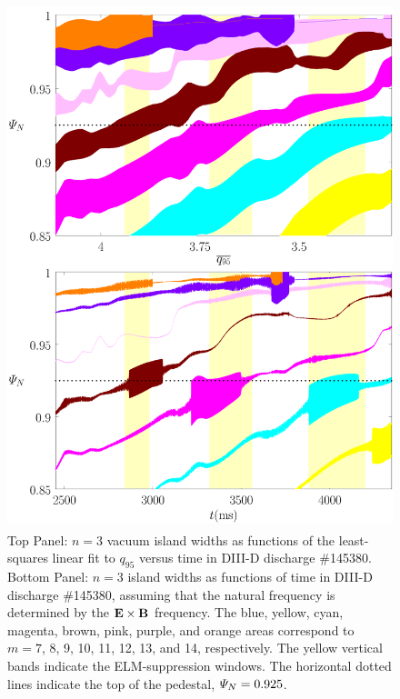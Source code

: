 \documentclass[12pt,prb,aps]{revtex4-1}
\begin{document}
\begin{figure}
\includegraphics[height=6in]{fig9.pdf}
\caption{Top Panel: $n=3$ vacuum island widths as functions of the least-squares linear fit to $q_{95}$ versus time
in   DIII-D discharge \#145380.
Bottom Panel:  $n=3$ island widths as functions of time
in   DIII-D discharge \#145380, assuming that the natural frequency is  determined by the ${\bf E}\times {\bf B}$
frequency. The blue, yellow, cyan, magenta, brown, pink,
purple, and orange  areas correspond to $m=7$, 8, 9, 10, 11, 12, 13, and 14, respectively. The yellow vertical bands indicate the ELM-suppression windows. 
The horizontal dotted lines indicate the top of the pedestal, ${\mit\Psi}_N=0.925$.} \label{fig9}
\end{figure}
\end{document}
